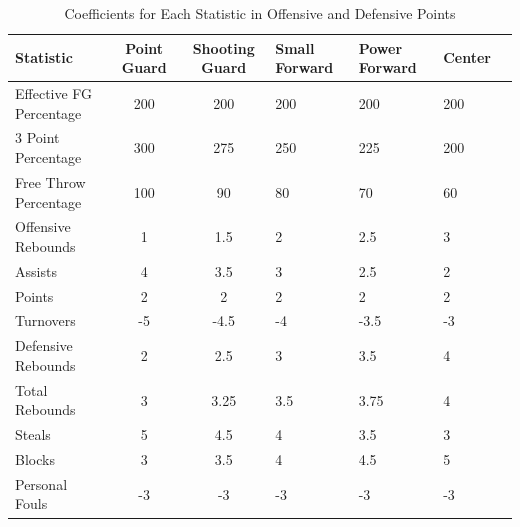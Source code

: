 \documentclass[12pt]{article}
\begin{document}
\vfill
\begin{table}[H]
  \caption{Coefficients for Each Statistic in Offensive and Defensive Points}
  \label{tab:Coefficientstable}
\centering
\begin{tabular}[t]{lccllll}
  \toprule
  Statistic & Point Guard & Shooting Guard & Small Forward & Power Forward & Center\\
  \midrule
 Effective FG Percentage & 200 & 200 & 200 & 200 & 200\\
 \midrule
 3 Point Percentage & 300 & 275 & 250 & 225 & 200\\
 \midrule
 Free Throw Percentage & 100 & 90 & 80 & 70 & 60\\
 \midrule
 Offensive Rebounds & 1 & 1.5 & 2 & 2.5 & 3\\
 \midrule
 Assists & 4 & 3.5 & 3 & 2.5 & 2\\
 \midrule
 Points & 2 & 2 & 2 & 2 & 2\\
 \midrule
 Turnovers & -5 & -4.5 & -4 & -3.5 & -3\\
 \midrule
 Defensive Rebounds & 2 & 2.5 & 3 & 3.5 & 4\\
 \midrule
 Total Rebounds & 3 & 3.25 & 3.5 & 3.75 & 4\\
 \midrule
 Steals & 5 & 4.5 & 4 & 3.5 & 3\\
 \midrule
 Blocks & 3 & 3.5 & 4 & 4.5 & 5\\
 \midrule
 Personal Fouls & -3 & -3 & -3 & -3 & -3\\
  \bottomrule
\end{tabular}
\end{table}
\end{document}
